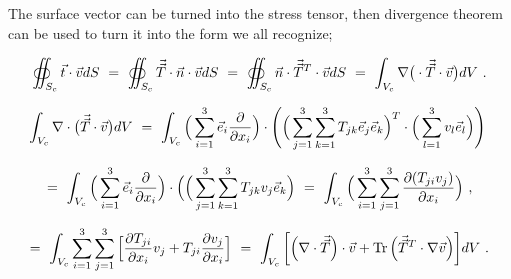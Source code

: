 \documentclass{article}
\DeclareMathOperator{\Tr}{Tr}
\begin{document}
The surface vector can be turned into the stress tensor, then divergence theorem can be used to 
turn it into the form we all recognize;

\begin{equation} \label{eb-eq-1-133}
\oiint_{S_c} \vec{t} \cdot \vec{v} dS \hspace{0.125cm} = \hspace{0.125cm} \oiint_{S_c} \vec{\vec{T}} \cdot \vec{n} \cdot \vec{v} dS \hspace{0.125cm} = \hspace{0.125cm} \oiint_{S_c} \vec{n} \cdot \vec{\vec{T}}^T \cdot \vec{v} dS \hspace{0.125cm} = \hspace{0.125cm} \int_{V_c} \nabla \big( \cdot \vec{\vec{T}} \cdot \vec{v} \big) dV \hspace{0.125cm}  . 
\end{equation} 

\begin{equation} \label{eb-eq-1-134}
\int_{V_c} \nabla  \cdot \big(\vec{\vec{T}} \cdot \vec{v} \big) dV \hspace{0.125cm} = \hspace{0.125cm} \int_{V_c} \Big( \sum_{i = 1}^{3} \vec{e}_i \frac{\partial}{\partial{x_i}} \Big) \cdot \Bigg( \Big( \sum_{j = 1}^{3} \sum_{k = 1}^{3} T_{j k} \vec{e}_j \vec{e}_k \Big)^T \cdot \Big( \sum_{l = 1}^{3} v_l \vec{e}_l \Big) \Bigg) \hspace{0.125cm}   
\end{equation} 

\vspace{-0.5cm}

\begin{equation} \label{eb-eq-1-135}
= \hspace{0.125cm} \int_{V_c} \Big( \sum_{i = 1}^{3} \vec{e}_i \frac{\partial}{\partial{x_i}} \Big) \cdot \Big( \Big( \sum_{j = 1}^{3} \sum_{k = 1}^{3} T_{j k} v_j \vec{e}_k \Big) \hspace{0.125cm} = \hspace{0.125cm} \int_{V_c} \Big( \sum_{i = 1}^{3} \sum_{j = 1}^{3} \frac{\partial(T_{j i} v_j)}{\partial{x_i}} \Big) \hspace{0.125cm}  , 
\end{equation} 

\begin{equation} \label{eb-eq-1-136}
= \hspace{0.125cm} \int_{V_c} \sum_{i = 1}^{3} \sum_{j = 1}^{3} \Big[\frac{\partial{T_{j i}}}{\partial{x_i}}  v_j  + T_{j i} \frac{\partial{v_j}}{\partial{x_i}} \Big] \hspace{0.125cm} = \hspace{0.125cm} \int_{V_c} \bigg[ \Big( \nabla \cdot \vec{\vec{T}} \Big) \cdot \vec{v} + \Tr \Big( \vec{\vec{T}}^T \cdot \nabla{\vec{v}} \Big) \bigg] dV \hspace{0.125cm}  .
\end{equation} 
\end{document}
